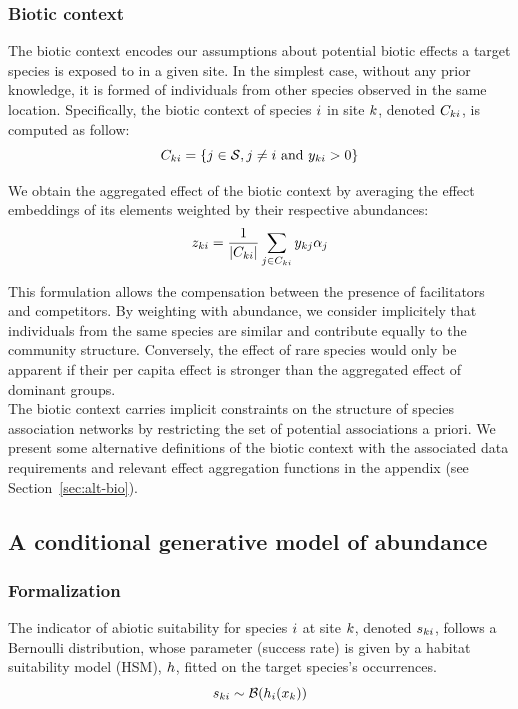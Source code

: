 \documentclass[10pt,a4paper]{article}
\begin{document}
\subsubsection{Biotic context}
The biotic context encodes our assumptions about potential biotic effects a target species is exposed to in a given site. In the simplest case, without any prior knowledge, it is formed of individuals from other species observed in the same location. Specifically, the biotic context of species $i$ in site $k$, denoted $C_{ki}$, is computed as follow:
\begin{equation*}
C_{ki} = \{j \in \mathcal{S}, j \neq i ~\text{and}~ y_{ki} > 0 \}
\end{equation*}

We obtain the aggregated effect of the biotic context by averaging the effect embeddings of its elements weighted by their respective abundances:   
\begin{equation*}
z_{ki} = \frac{1}{\left\lvert C_{ki}\right\rvert} \sum_{j \in C_{ki}} y_{kj} \alpha_{j}
\end{equation*}

This formulation allows the compensation between the presence of facilitators and competitors. By weighting with abundance, we consider implicitely that individuals from the same species are similar and contribute equally to the community structure. Conversely, the effect of rare species would only be apparent if their per capita effect is stronger than the aggregated effect of dominant groups.\\

The biotic context carries implicit constraints on the structure of species association networks by restricting the set of potential associations a priori. We present some alternative definitions of the biotic context with the associated data requirements and relevant effect aggregation functions in the appendix (see Section~\ref{sec:alt-bio}). 

\subsection{A conditional generative model of abundance}

\subsubsection{Formalization}
The indicator of abiotic suitability for species $i$ at site $k$, denoted $s_{ki}$, follows a Bernoulli distribution, whose parameter (success rate) is given by a habitat suitability model (HSM), $h$, fitted on the target species's occurrences.
\begin{equation*}
    s_{ki} \sim \mathcal{B}(h_{i}(x_{k}))
\end{equation*}
\end{document}
